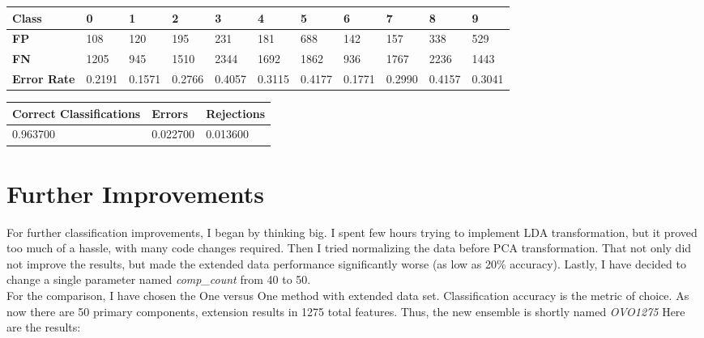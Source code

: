 \documentclass[
  a4paper,            %
  DIV=10,             %
  oneside,            %
  BCOR=5mm,           %
  parskip=half,       %
  numbers=noenddot,   %
  bibtotoc,           %
  listof=totoc,        %
  article
]{scrreprt}
\begin{document}
\begin{center}
  \begin{tabular}{|p{1cm}|p{1cm}|p{1cm}|p{1cm}|p{1cm}|p{1cm}|p{1cm}|p{1cm}|p{1cm}|p{1cm}|p{1cm}|}
    \hline
    \textbf{Class} & \textbf{0} & \textbf{1} & \textbf{2} & \textbf{3} & \textbf{4} & \textbf{5} & \textbf{6} & \textbf{7} & \textbf{8} & \textbf{9} \\
    \hline
    \textbf{FP} & 108 & 120 & 195 & 231 & 181 & 688 & 142 & 157 & 338 & 529 \\
    \hline
    \textbf{FN} & 1205 & 945 & 1510 & 2344 & 1692 & 1862 & 936 & 1767 & 2236 & 1443 \\
    \hline
    \textbf{Error Rate} & 0.2191 & 0.1571 & 0.2766 & 0.4057 & 0.3115 & 0.4177 & 0.1771 & 0.2990 & 0.4157 & 0.3041 \\
    \hline
  \end{tabular}
\end{center}

\begin{center}
  \begin{tabular}{|p{5cm}|p{3cm}|p{3cm}|}
    \hline
    \textbf{Correct Classifications} & \textbf{Errors} & \textbf{Rejections} \\
    \hline
    0.963700 & 0.022700 & 0.013600 \\
    \hline
  \end{tabular}
\end{center}
\section{Further Improvements}
For further classification improvements, I began by thinking big.
I spent few hours trying to implement LDA transformation, but it proved too much of a hassle, with many code changes required.
Then I tried normalizing the data before PCA transformation.
That not only did not improve the results, but made the extended data performance significantly worse (as low as 20\% accuracy).
Lastly, I have decided to change a single parameter named \textit{comp\_count} from 40 to 50.
\\
For the comparison, I have chosen the One versus One method with extended data set.
Classification accuracy is the metric of choice.
As now there are 50 primary components, extension results in 1275 total features.
Thus, the new ensemble is shortly named \textit{OVO1275}
Here are the results:
\end{document}
